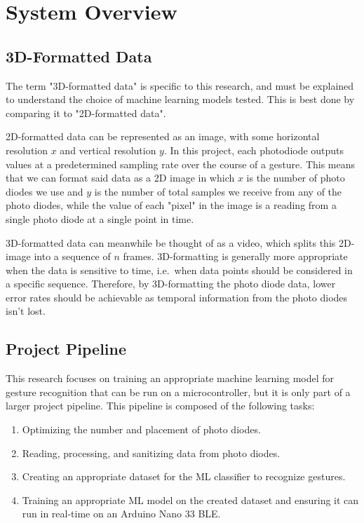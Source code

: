 \section{System Overview}\label{sec:system-overview}
\subsection{3D-Formatted Data}\label{subsec:3d-formatted-data}
The term "3D-formatted data" is specific to this research, and must be explained to understand the choice of machine learning models tested.
This is best done by comparing it to "2D-formatted data".

2D-formatted data can be represented as an image, with some horizontal resolution $x$ and vertical resolution $y$.
In this project, each photodiode outputs values at a predetermined sampling rate over the course of a gesture.
This means that we can format said data as a 2D image in which $x$ is the number of photo diodes we use and $y$ is the number of total samples we receive from any of the photo diodes, while the value of each "pixel" in the image is a reading from a single photo diode at a single point in time.

3D-formatted data can meanwhile be thought of as a video, which splits this 2D-image into a sequence of $n$ frames.
3D-formatting is generally more appropriate when the data is sensitive to time, i.e.\ when data points should be considered in a specific sequence.
Therefore, by 3D-formatting the photo diode data, lower error rates should be achievable as temporal information from the photo diodes isn't lost.

\subsection{Project Pipeline}\label{subsec:project-pipeline}
This research focuses on training an appropriate machine learning model for gesture recognition that can be run on a microcontroller, but it is only part of a larger project pipeline.
This pipeline is composed of the following tasks:
\begin{enumerate}
    \item Optimizing the number and placement of photo diodes.
    \item Reading, processing, and sanitizing data from photo diodes.
    \item Creating an appropriate dataset for the ML classifier to recognize gestures.
    \item Training an appropriate ML model on the created dataset and ensuring it can run in real-time on an Arduino Nano 33 BLE\@.
\end{enumerate}

